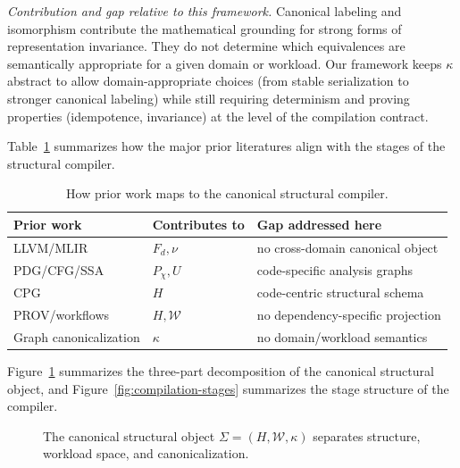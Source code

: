 \documentclass[11pt]{article}
\begin{document}
\emph{Contribution and gap relative to this framework.} Canonical labeling and isomorphism contribute the mathematical grounding for strong forms of representation invariance. They do not determine which equivalences are semantically appropriate for a given domain or workload. Our framework keeps $\kappa$ abstract to allow domain-appropriate choices (from stable serialization to stronger canonical labeling) while still requiring determinism and proving properties (idempotence, invariance) at the level of the compilation contract.

Table~\ref{tab:related-work-map} summarizes how the major prior literatures align with the stages of the structural compiler.

\begin{table}[t]
\centering
\begin{tabular}{@{}lll@{}}
\toprule
Prior work & Contributes to & Gap addressed here \\
\midrule
LLVM/MLIR & $F_d,\nu$ & no cross-domain canonical object \\
PDG/CFG/SSA & $P_\chi,U$ & code-specific analysis graphs \\
CPG & $H$ & code-centric structural schema \\
PROV/workflows & $H,\mathcal W$ & no dependency-specific projection \\
Graph canonicalization & $\kappa$ & no domain/workload semantics \\
\bottomrule
\end{tabular}
\caption{How prior work maps to the canonical structural compiler.}
\label{tab:related-work-map}
\end{table}

Figure~\ref{fig:canonical-object} summarizes the three-part decomposition of the canonical structural object, and Figure~\ref{fig:compilation-stages} summarizes the stage structure of the compiler.

\begin{figure}[t]
  \centering
  \caption{The canonical structural object $\Sigma=(H,\mathcal W,\kappa)$ separates structure, workload space, and canonicalization.}
  \label{fig:canonical-object}
\end{figure}
\end{document}
